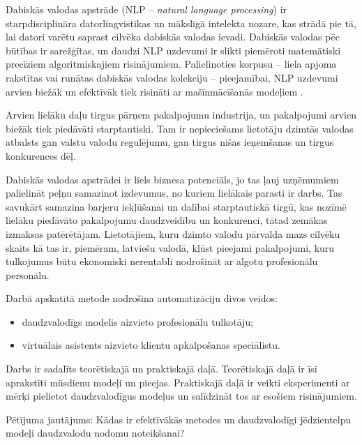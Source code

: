 Dabiskās valodas apstrāde (NLP -- \textit{natural language processing}) ir starpdisciplināra datorlingvistikas un mākslīgā intelekta nozare, kas strādā pie tā, lai datori varētu saprast cilvēka dabiskās valodas ievadi. Dabiskās valodas pēc būtības ir sarežģītas, un daudzi NLP uzdevumi ir slikti piemēroti matemātiski precīziem algoritmiskajiem risinājumiem. Palielinoties korpusu -- liela apjoma rakstītas vai runātas dabiskās valodas kolekciju -- pieejamībai, NLP uzdevumi arvien biežāk un efektīvāk tiek risināti ar mašīnmācīšanās modeļiem \cite{nlp2018}.


Arvien lielāku daļu tirgus pārņem pakalpojumu industrija,
un pakalpojumi arvien biežāk tiek piedāvāti starptautiski. Tam ir nepieciešams lietotāju dzimtās valodas atbalsts gan valstu valodu regulējumu, gan tirgus nišas ieņemšanas un tirgus konkurences dēļ.

Dabiskās valodas apstrādei ir liels biznesa potenciāls, jo tas ļauj uzņēmumiem palielināt peļņu samazinot izdevumus, no kuriem lielākais parasti ir darbs. %
Tas savukārt samazina barjeru iekļūšanai un dalībai starptautiskā tirgū, kas nozīmē lielāku piedāvāto pakalpojumu daudzveidību un konkurenci, tātad zemākas izmaksas patērētājam. Lietotājiem, kuru dzimto valodu pārvalda mazs cilvēku skaits kā tas ir, piemēram, latviešu valodā, kļūst pieejami pakalpojumi, kuru tulkojumus būtu ekonomiski nerentabli nodrošināt ar algotu profesionālu personālu.

Darbā apskatītā metode nodrošina automatizāciju divos veidos: 
\begin{itemize}
	\item daudzvalodīgs modelis aizvieto profesionālu tulkotāju;
	\item virtuālais asistents aizvieto klientu apkalpošanas speciālistu.
\end{itemize}

Darbs ir sadalīts teorētiskajā un praktiskajā daļā. Teorētiskajā daļā ir īsi aprakstīti mūsdienu modeļi un pieejas. Praktiskajā daļā ir veikti eksperimenti ar mērķi pielietot daudzvalodīgus modeļus un salīdzināt tos ar esošiem risinājumiem.

Pētījuma jautājums: Kādas ir efektīvākās metodes un daudzvalodīgi jēdzientelpu modeļi daudzvalodu nodomu noteikšanai?